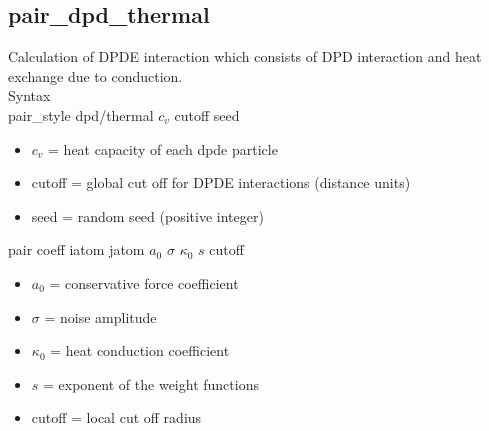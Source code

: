 \subsection{pair\_dpd\_thermal}
Calculation of DPDE interaction which consists of DPD interaction and heat exchange due to conduction.\\
Syntax\\
pair\_style dpd/thermal $c_{v}$ cutoff seed
\begin{itemize}
	\item $c_{v}$ = heat capacity of each dpde particle
	\item cutoff =  global cut off for DPDE interactions (distance units)
	\item seed = random seed (positive integer)
\end{itemize}
pair coeff iatom jatom $a_{0}$ $\sigma$ $\kappa_{0}$ $s$ cutoff 
\begin{itemize}
	\item $a_{0}$ = conservative force coefficient
	\item $\sigma$ = noise amplitude
	\item $\kappa_{0}$ = heat conduction coefficient 
	\item $s$ = exponent of the weight functions
	\item cutoff =  local cut off radius
\end{itemize}

